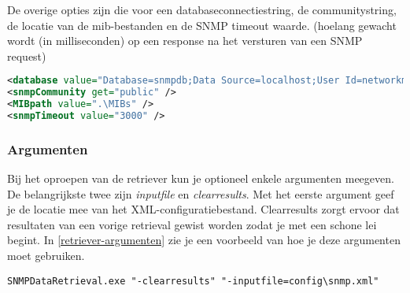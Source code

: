 De overige opties zijn die voor een databaseconnectiestring, de communitystring, de locatie van de \gls{mib}-bestanden en de SNMP timeout waarde.
(hoelang gewacht wordt (in milliseconden) op een response na het versturen van een SNMP request)

\begin{lstlisting}[language=XML, float=h, caption={Overige opties in het XML-configuratiebestand}, label=xmlconfig-misc]
<database value="Database=snmpdb;Data Source=localhost;User Id=networkminer;Password=SomePassword;Port=3306;old syntax=yes"/>
<snmpCommunity get="public" />
<MIBpath value=".\MIBs" />
<snmpTimeout value="3000" />
\end{lstlisting}


\subsubsection{Argumenten}
Bij het oproepen van de retriever kun je optioneel enkele argumenten meegeven.
De belangrijkste twee zijn \emph{inputfile} en \emph{clearresults}.
Met het eerste argument geef je de locatie mee van het XML-configuratiebestand.
Clearresults zorgt ervoor dat resultaten van een vorige retrieval gewist worden zodat je met een schone lei begint.
In \lstlistingnamesentence \ref{retriever-argumenten} zie je een voorbeeld van hoe je deze argumenten moet gebruiken.

\begin{lstlisting}[float=h, caption={Oproepen van SNMP Data Retriever met twee argumenten}, label=retriever-argumenten]
SNMPDataRetrieval.exe "-clearresults" "-inputfile=config\snmp.xml"
\end{lstlisting}



